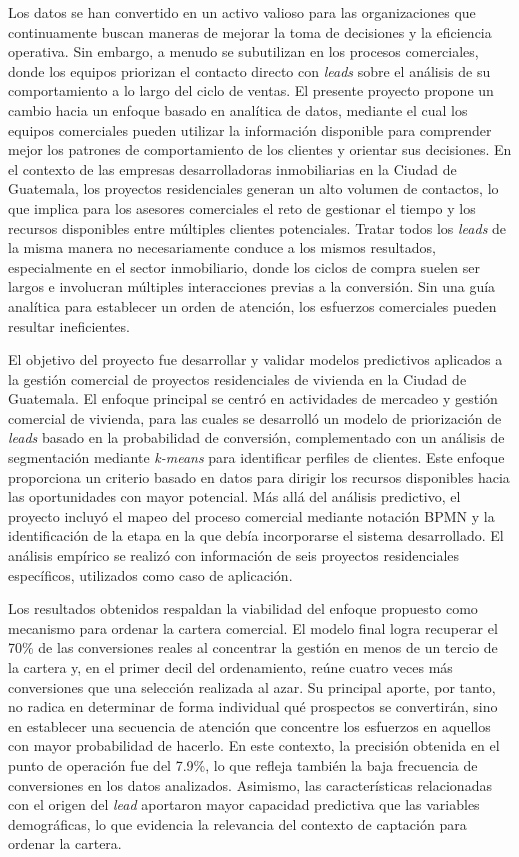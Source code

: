 Los datos se han convertido en un activo valioso para las organizaciones que continuamente buscan maneras de mejorar la toma de decisiones y la eficiencia operativa. Sin embargo, a menudo se subutilizan en los procesos comerciales, donde los equipos priorizan el contacto directo con \textit{leads} sobre el análisis de su comportamiento a lo largo del ciclo de ventas. El presente proyecto propone un cambio hacia un enfoque basado en analítica de datos, mediante el cual los equipos comerciales pueden utilizar la información disponible para comprender mejor los patrones de comportamiento de los clientes y orientar sus decisiones. En el contexto de las empresas desarrolladoras inmobiliarias en la Ciudad de Guatemala, los proyectos residenciales generan un alto volumen de contactos, lo que implica para los asesores comerciales el reto de gestionar el tiempo y los recursos disponibles entre múltiples clientes potenciales. Tratar todos los \textit{leads} de la misma manera no necesariamente conduce a los mismos resultados, especialmente en el sector inmobiliario, donde los ciclos de compra suelen ser largos e involucran múltiples interacciones previas a la conversión. Sin una guía analítica para establecer un orden de atención, los esfuerzos comerciales pueden resultar ineficientes.

El objetivo del proyecto fue desarrollar y validar modelos predictivos aplicados a la gestión comercial de proyectos residenciales de vivienda en la Ciudad de Guatemala. El enfoque principal se centró en actividades de mercadeo y gestión comercial de vivienda, para las cuales se desarrolló un modelo de priorización de \textit{leads} basado en la probabilidad de conversión, complementado con un análisis de segmentación mediante \textit{k-means} para identificar perfiles de clientes. Este enfoque proporciona un criterio basado en datos para dirigir los recursos disponibles hacia las oportunidades con mayor potencial. Más allá del análisis predictivo, el proyecto incluyó el mapeo del proceso comercial mediante notación BPMN y la identificación de la etapa en la que debía incorporarse el sistema desarrollado. El análisis empírico se realizó con información de seis proyectos residenciales específicos, utilizados como caso de aplicación.

Los resultados obtenidos respaldan la viabilidad del enfoque propuesto como mecanismo para ordenar la cartera comercial. El modelo final logra recuperar el 70\% de las conversiones reales al concentrar la gestión en menos de un tercio de la cartera y, en el primer decil del ordenamiento, reúne cuatro veces más conversiones que una selección realizada al azar. Su principal aporte, por tanto, no radica en determinar de forma individual qué prospectos se convertirán, sino en establecer una secuencia de atención que concentre los esfuerzos en aquellos con mayor probabilidad de hacerlo. En este contexto, la precisión obtenida en el punto de operación fue del 7.9\%, lo que refleja también la baja frecuencia de conversiones en los datos analizados. Asimismo, las características relacionadas con el origen del \textit{lead} aportaron mayor capacidad predictiva que las variables demográficas, lo que evidencia la relevancia del contexto de captación para ordenar la cartera.

